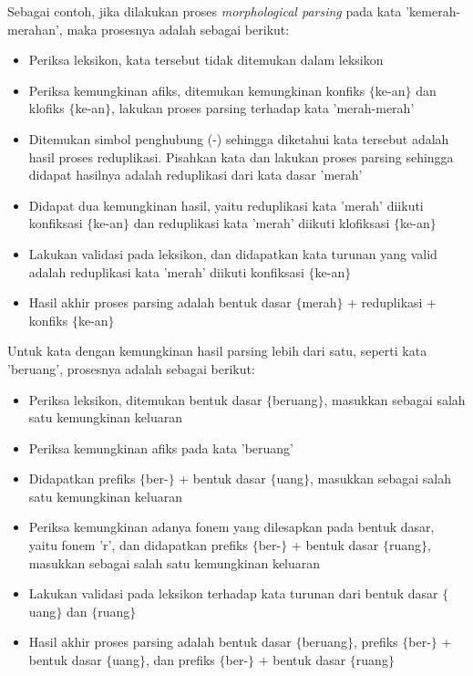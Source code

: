 Sebagai contoh, jika dilakukan proses \textit{morphological parsing} pada kata 'kemerah-merahan', maka prosesnya adalah sebagai berikut:
\begin{itemize}
	\item Periksa leksikon, kata tersebut tidak ditemukan dalam leksikon
	\item Periksa kemungkinan afiks, ditemukan kemungkinan konfiks $\lbrace$ke-an$\rbrace$ dan klofiks $\lbrace$ke-an$\rbrace$, lakukan proses parsing terhadap kata 'merah-merah'
	\item Ditemukan simbol penghubung (-) sehingga diketahui kata tersebut adalah hasil proses reduplikasi. Pisahkan kata dan lakukan proses parsing sehingga didapat hasilnya adalah reduplikasi dari kata dasar 'merah'
	\item Didapat dua kemungkinan hasil, yaitu reduplikasi kata 'merah' diikuti konfiksasi $\lbrace$ke-an$\rbrace$ dan reduplikasi kata 'merah' diikuti klofiksasi $\lbrace$ke-an$\rbrace$
	\item Lakukan validasi pada leksikon, dan didapatkan kata turunan yang valid adalah reduplikasi kata 'merah' diikuti konfiksasi $\lbrace$ke-an$\rbrace$
	\item Hasil akhir proses parsing adalah bentuk dasar $\lbrace$merah$\rbrace$ + reduplikasi + konfiks $\lbrace$ke-an$\rbrace$
\end{itemize}


Untuk kata dengan kemungkinan hasil parsing lebih dari satu, seperti kata 'beruang', prosesnya adalah sebagai berikut:
\begin{itemize}
	\item Periksa leksikon, ditemukan bentuk dasar $\lbrace$beruang$\rbrace$, masukkan sebagai salah satu kemungkinan keluaran
	\item Periksa kemungkinan afiks pada kata 'beruang'
	\item Didapatkan prefiks $\lbrace$ber-$\rbrace$ + bentuk dasar $\lbrace$uang$\rbrace$, masukkan sebagai salah satu kemungkinan keluaran
	\item Periksa kemungkinan adanya fonem yang dilesapkan pada bentuk dasar, yaitu fonem 'r', dan didapatkan prefiks $\lbrace$ber-$\rbrace$ + bentuk dasar $\lbrace$ruang$\rbrace$, masukkan sebagai salah satu kemungkinan keluaran
	\item Lakukan validasi pada leksikon terhadap kata turunan dari bentuk dasar $\lbrace$uang$\rbrace$ dan $\lbrace$ruang$\rbrace$
	\item Hasil akhir proses parsing adalah bentuk dasar $\lbrace$beruang$\rbrace$, prefiks $\lbrace$ber-$\rbrace$ + bentuk dasar $\lbrace$uang$\rbrace$, dan prefiks $\lbrace$ber-$\rbrace$ + bentuk dasar $\lbrace$ruang$\rbrace$
\end{itemize}

